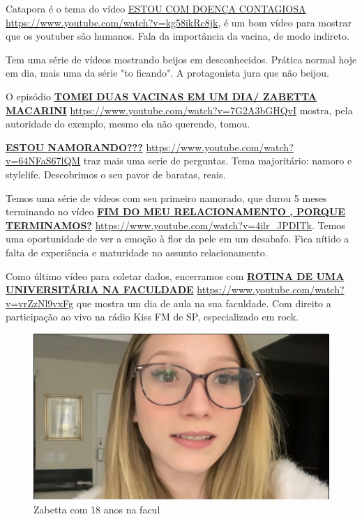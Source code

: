 Catapora é o tema do vídeo \href{https://www.youtube.com/watch?v=kg58ikRc8jk}{ESTOU COM DOENÇA CONTAGIOSA} \url{https://www.youtube.com/watch?v=kg58ikRc8jk}, é um bom vídeo para mostrar que os youtuber são humanos. Fala da importância da vacina, de modo indireto.

Tem uma série de vídeos mostrando beijos em desconhecidos. Prática normal hoje em dia, mais uma da série "to ficando". A protagonista jura que não beijou.

O episódio \href{https://www.youtube.com/watch?v=7G2A3bGHQvI}{\textbf{TOMEI DUAS VACINAS EM UM DIA/ ZABETTA MACARINI}} \url{https://www.youtube.com/watch?v=7G2A3bGHQvI} mostra, pela autoridade do exemplo, mesmo ela não querendo, tomou.

\href{https://www.youtube.com/watch?v=64NFaS67lQM}{\textbf{ESTOU NAMORANDO???}} \url{https://www.youtube.com/watch?v=64NFaS67lQM} traz mais uma serie de perguntas. Tema majoritário: namoro e stylelife. Descobrimos o seu pavor de baratas, reais.

Temos uma série de vídeos com seu primeiro namorado, que durou 5 meses terminando no vídeo \href{https://www.youtube.com/watch?v=4ilr_JPDITk}{\textbf{FIM DO MEU RELACIONAMENTO , PORQUE TERMINAMOS?}} \url{https://www.youtube.com/watch?v=4ilr_JPDITk}. Temos uma oportunidade de ver a emoção à flor da pele em um desabafo.
Fica nítido a falta de experiência e maturidade no assunto relacionamento.

Como último vídeo para coletar dados, encerramos com \href{https://www.youtube.com/watch?v=vrZzNl9vxFg}{\textbf{ROTINA DE UMA UNIVERSITÁRIA NA FACULDADE}} \url{https://www.youtube.com/watch?v=vrZzNl9vxFg} que mostra um dia de aula na sua faculdade. Com direito a participação ao vivo na rádio Kiss FM de SP, especializado em rock.

\begin{figure}[h!]
    \centering
    \includegraphics[width=0.7\linewidth]{fig/Zabetta-18-anos-facul}
    \caption{Zabetta com 18 anos na facul}
    \label{fig:zabetta-18-anos-facul}
\end{figure}

